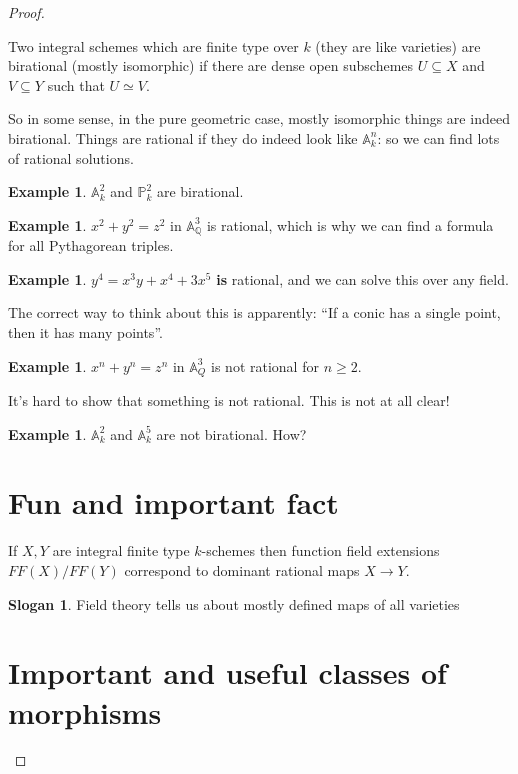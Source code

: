 \documentclass{book}
\newcommand{\Q}{\ensuremath{\mathbb{Q}}}
\renewcommand{\P}{\ensuremath{\mathbb{P}}}
\newcommand{\A}{\ensuremath{\mathbb{A}}}
\theoremstyle{definition}
\newtheorem{example}[theorem]{Example}
\newtheorem{slogan}[theorem]{Slogan}
\begin{document}
\begin{proof}
\begin{proposition}
Two integral schemes which are finite type over $k$ (they are like varieties)
are birational (mostly isomorphic) if there are dense open subschemes $U
\subseteq X$ and $V \subseteq Y$ such that $U
\simeq V$.
\end{proposition}

So in some sense, in the pure geometric case, mostly isomorphic things are
indeed birational. Things are rational if they do indeed look like $\A_k^n$:
so we can find lots of rational solutions.


\begin{example}
$\A_k^2$ and $\P_k^2$ are birational.
\end{example}

\begin{example}
$x^2 + y^2 = z^2$ in $\A^3_\Q$ is rational, which is why we can find a formula
for all Pythagorean triples.
\end{example}


\begin{example}
$y^4 = x^3y + x^4 + 3x^5$ \textbf{is} rational, and we can solve this over
any field.
\end{example}

The correct way to think about this is apparently: ``If a conic has a single
point, then it has many points''.

\begin{example}
$x^n + y^n = z^n$ in $\A^3_Q$ is not rational for $n \geq 2$.
\end{example}
It's hard to show that something is not rational. This is not at all clear!

\begin{example}
$\A^2_k$ and $\A^5_k$ are not birational. How?
\end{example}

\section{Fun and important fact}

If $X, Y$ are integral finite type $k$-schemes then function field extensions
$FF(X)/FF(Y)$ correspond to dominant rational maps $X \rightarrow Y$.

\begin{slogan}
Field theory tells us about mostly defined maps of all varieties
\end{slogan}

\section{Important and useful classes of morphisms}



\end{proof}
\end{document}
